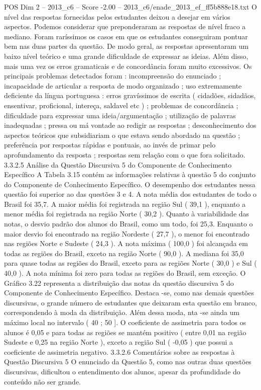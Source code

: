 \begin{textsample}{POS Dim 2 – 2013\_c6 – Score -2.00 – 2013\_c6/enade\_2013\_ef\_ff5b888e18.txt}
O nível das respostas fornecidas pelos estudantes deixou a desejar em vários aspectos.
Podemos considerar que preponderaram as respostas de nível fraco a mediano.
Foram raríssimos os casos em que os estudantes conseguiram pontuar bem nas duas partes da questão.
De modo geral, as respostas apresentaram um baixo nível teórico e uma grande dificuldade de expressar as ideias.
Além disso, mais uma vez os erros gramaticais e de concordância foram muito excessivos.
Os principais problemas detectados foram : incompreensão do enunciado ; incapacidade de articular a resposta de modo organizado ; uso extremamente deficiente da língua portuguesa : erros gravíssimos de escrita ( cidadões, sidadãos, ensentivar, proficional, intereça, saldavel etc ) ; problemas de concordância ; dificuldade para expressar uma ideia/argumentação ; utilização de palavras inadequadas ; pressa ou má vontade ao redigir as respostas ; desconhecimento dos aspectos teóricos que subsidiariam o que estava sendo abordado na questão ; preferência por respostas rápidas e pontuais, ao invés de primar pelo aprofundamento da resposta ; respostas sem relação com o que fora solicitado. 3.3.2.5 Análise da Questão Discursiva 5 do Componente de Conhecimento Específico A Tabela 3.15 contém as informações relativas à questão 5 do conjunto do Componente de Conhecimento Específico.
O desempenho dos estudantes nessa questão foi superior ao das questões 3 e 4.
A nota média dos estudantes de todo o Brasil foi 35,7.
A maior média foi registrada na região Sul ( 39,1 ), enquanto a menor média foi registrada na região Norte ( 30,2 ).
Quanto à variabilidade das notas, o desvio padrão dos alunos do Brasil, como um todo, foi 25,3.
Enquanto o maior desvio foi encontrado na região Nordeste ( 27,7 ), o menor foi encontrado nas regiões Norte e Sudeste ( 24,3 ).
A nota máxima ( 100,0 ) foi alcançada em todas as regiões do Brasil, exceto na região Norte ( 90,0 ).
A mediana foi 35,0 para quase todas as regiões do Brasil, exceto para as regiões Norte ( 30,0 ) e Sul ( 40,0 ).
A nota mínima foi zero para todas as regiões do Brasil, sem exceção.
O Gráfico 3.22 representa a distribuição das notas da questão discursiva 5 do Componente de Conhecimento Específico.
Destaca -se, como nas demais questões discursivas, o grande número de estudantes que deixaram esta questão em branco, correspondendo à moda da distribuição.
Além dessa moda, nta -se ainda um máximo local no intervalo ( 40 ; 50 ].
O coeficiente de assimetria para todos os alunos é 0,05 e para todas as regiões se mantém positivo ( entre 0,01 na região Sudeste e 0,25 na região Norte ), exceto a região Sul ( -0,05 ) que possui a coeficiente de assimetria negativo. 3.3.2.6 Comentários sobre as respostas à Questão Discursiva 5 O enunciado da Questão 5, como nas outras duas questões discursivas, dificultou o entendimento dos alunos, apesar da profundidade do conteúdo não ser grande.

\end{textsample}
